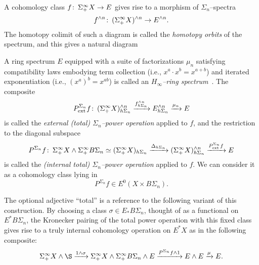 \noindent A cohomology class \(f\colon\thinspace \Sigma^\infty_+ X \to E\) gives rise to a morphism of \(\Sigma_n\)--spectra \[f^{\wedge n}\colon\thinspace (\Sigma^\infty_+ X)^{\wedge n} \to E^{\wedge n}.\]  The homotopy colimit of such a diagram is called the \textit{homotopy orbits} of the spectrum, and this gives a natural diagram
\begin{center}
\end{center}
A ring spectrum \(E\) equipped with a suite of factorizations \(\mu_n\) satisfying compatibility laws embodying term collection (i.e., \(x^a \cdot x^b = x^{a+b}\)) and iterated exponentiation (i.e., \((x^a)^b = x^{ab}\)) is called an \textit{\(H_\infty\)--ring spectrum}~\cite[Definition I.3.1]{BMMS}.  The composite \[P^{\Sigma_n}_{\mathrm{ext}}f\colon\thinspace (\Sigma^\infty_+ X)^{\wedge n}_{h\Sigma_n} \xrightarrow{f^{\wedge n}_{h\Sigma_n}} E^{\wedge n}_{h\Sigma_n} \xrightarrow{\mu_n} E\] is called the \textit{external (total) \(\Sigma_n\)--power operation} applied to \(f\), and the restriction to the diagonal subspace \[P^{\Sigma_n}f \colon\thinspace \Sigma^\infty_+ X \wedge \Sigma^\infty_+ B\Sigma_n \simeq (\Sigma^\infty_+ X)_{h\Sigma_n} \xrightarrow{\Delta_{h\Sigma_n}} (\Sigma^\infty_+ X)^{\wedge n}_{h\Sigma_n} \xrightarrow{P^{\Sigma_n}_{\mathrm{ext}}f} E\] is called the \textit{(internal total) \(\Sigma_n\)--power operation} applied to \(f\).  We can consider it as a cohomology class lying in \[P^{\Sigma_n} f \in E^0(X \times B\Sigma_n).\]

\begin{remark}\label{RestrictingSteenrodOpToBasepoint}
The optional adjective ``total'' is a reference to the following variant of this construction.  By choosing a class \(\sigma \in E_* B\Sigma_n\), thought of as a functional on \(E^* B\Sigma_n\), the Kronecker pairing of the total power operation with this fixed class gives rise to a truly internal cohomology operation on \(E^* X\) as in the following composite: \[\Susp^\infty_+ X \sm \S \xrightarrow{1 \sm \sigma} \Susp^\infty_+ X \sm \Susp^\infty_+ B\Sigma_n \sm E \xrightarrow{P^{\Sigma_n} f \sm 1} E \sm E \xrightarrow{\mu} E.\]
\end{remark}

